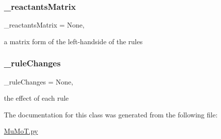 \subsubsection{\texorpdfstring{\+\_\+reactants\+Matrix}{\_reactantsMatrix}}
{\footnotesize\ttfamily \+\_\+reactants\+Matrix = None\hspace{0.3cm}{\ttfamily [static]}, {\ttfamily [private]}}



a matrix form of the left-\/handside of the rules 

\mbox{\label{class_mu_mo_t_1_1_mu_mo_t_s_s_a_view_a6a882ef2523ac168ac8a5c87e78b8ed0}} 
\subsubsection{\texorpdfstring{\+\_\+rule\+Changes}{\_ruleChanges}}
{\footnotesize\ttfamily \+\_\+rule\+Changes = None\hspace{0.3cm}{\ttfamily [static]}, {\ttfamily [private]}}



the effect of each rule 



The documentation for this class was generated from the following file\+:\begin{DoxyCompactItemize}
\item 
\hyperlink{_mu_mo_t_8py}{Mu\+Mo\+T.\+py}\end{DoxyCompactItemize}
